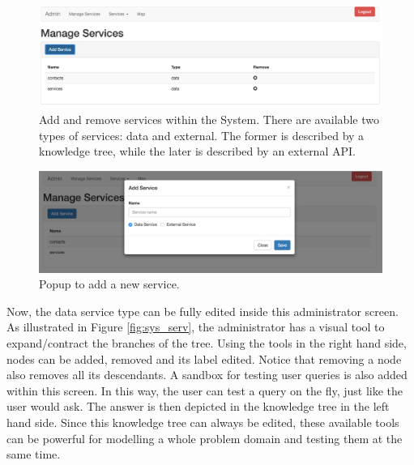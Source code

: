 \begin{figure}[htbp]
\begin{center}
\includegraphics[width=\textwidth]{figures/manage_serv.png}
\caption{Add and remove services within the System. There are available two types of services: data and external. The former is described by a knowledge tree, while the later is described by an external API.}
\label{fig:sys_mang_serv}
\end{center}
\end{figure}

\begin{figure}[htbp]
\begin{center}
\includegraphics[width=\textwidth]{figures/add_serv.png}
\caption{Popup to add a new service.}
\label{fig:sys_add_serv}
\end{center}
\end{figure}

Now, the data service type can be fully edited inside this administrator screen.
As illustrated in Figure \ref{fig:sys_serv}, the administrator has a visual tool to expand/contract the branches of the tree.
Using the tools in the right hand side, nodes can be added, removed and its label edited.
Notice that removing a node also removes all its descendants.
A sandbox for testing user queries is also added within this screen.
In this way, the user can test a query on the fly, just like the user would ask.
The answer is then depicted in the knowledge tree in the left hand side.
Since this knowledge tree can always be edited, these available tools can be powerful for modelling a whole problem domain and testing them at the same time.

